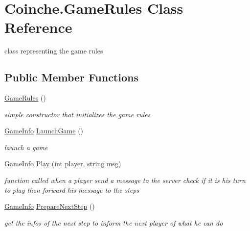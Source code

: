 \hypertarget{class_coinche_1_1_game_rules}{}\section{Coinche.\+Game\+Rules Class Reference}
\label{class_coinche_1_1_game_rules}


class representing the game rules  


\subsection*{Public Member Functions}
\begin{DoxyCompactItemize}
\item 
\hyperlink{class_coinche_1_1_game_rules_a48e1130afad00673e21c933cb0ed84e0}{Game\+Rules} ()
\begin{DoxyCompactList}\small\item\em simple constructor that initializes the game rules \end{DoxyCompactList}\item 
\hyperlink{class_coinche_1_1_tools_1_1_game_info}{Game\+Info} \hyperlink{class_coinche_1_1_game_rules_a7ecb23a0c1a81fa162940a43ccefe022}{Launch\+Game} ()
\begin{DoxyCompactList}\small\item\em launch a game \end{DoxyCompactList}\item 
\hyperlink{class_coinche_1_1_tools_1_1_game_info}{Game\+Info} \hyperlink{class_coinche_1_1_game_rules_aa053d6c7c191f62268d4bb5a37c32810}{Play} (int player, string msg)
\begin{DoxyCompactList}\small\item\em function called when a player send a message to the server check if it is his turn to play then forward his message to the steps \end{DoxyCompactList}\item 
\hyperlink{class_coinche_1_1_tools_1_1_game_info}{Game\+Info} \hyperlink{class_coinche_1_1_game_rules_a0789b63674da204c957ba7b98e53db4b}{Prepare\+Next\+Step} ()
\begin{DoxyCompactList}\small\item\em get the infos of the next step to inform the next player of what he can do \end{DoxyCompactList}\end{DoxyCompactItemize}
